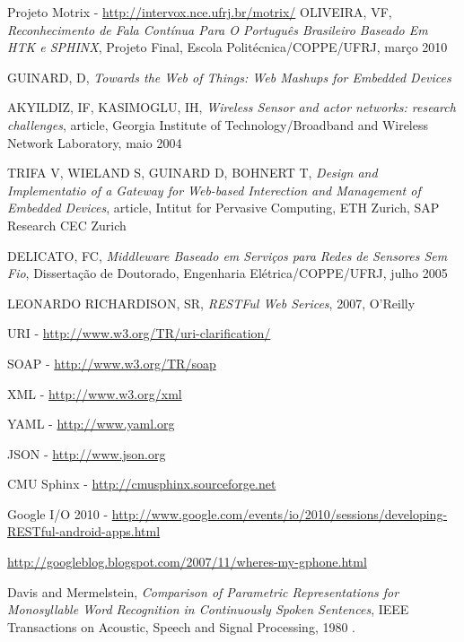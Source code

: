 \documentclass[12pt,a4paper,oneside]{report}
\begin{document}
\begin{thebibliography}{99}
	Projeto Motrix - \url{http://intervox.nce.ufrj.br/motrix/}
	OLIVEIRA, VF,
	\emph{Reconhecimento de Fala Contínua Para O Português Brasileiro Baseado Em HTK e SPHINX}, Projeto Final, Escola Politécnica/COPPE/UFRJ, março 2010

	GUINARD, D,
	\emph{Towards the Web of Things: Web Mashups for Embedded Devices}

	AKYILDIZ, IF, KASIMOGLU, IH,
	\emph{Wireless Sensor and actor networks: research challenges},
	article, Georgia Institute of Technology/Broadband and Wireless Network Laboratory, maio 2004

	TRIFA V, WIELAND S, GUINARD D, BOHNERT T,
	\emph{Design and Implementatio of a Gateway for Web-based Interection and Management of Embedded Devices},
	article, Intitut for Pervasive Computing, ETH Zurich, SAP Research CEC Zurich

	DELICATO, FC,
	\emph{Middleware Baseado em Serviços para Redes de Sensores Sem Fio},
	Dissertação de Doutorado,
	Engenharia Elétrica/COPPE/UFRJ, julho 2005

	LEONARDO RICHARDISON, SR,
	\emph{RESTFul Web Serices}, 2007, O'Reilly

	URI - \url{http://www.w3.org/TR/uri-clarification/}

	SOAP - \url{http://www.w3.org/TR/soap}

	XML - \url{http://www.w3.org/xml}

	YAML - \url{http://www.yaml.org}

	JSON - \url{http://www.json.org}

	CMU Sphinx - \url{http://cmusphinx.sourceforge.net}

	Google I/O 2010 - \url{http://www.google.com/events/io/2010/sessions/developing-RESTful-android-apps.html}

	\url{http://googleblog.blogspot.com/2007/11/wheres-my-gphone.html}

	Davis and Mermelstein, 
	\emph{Comparison of Parametric Representations for Monosyllable Word Recognition in Continuously Spoken Sentences},
	IEEE Transactions on Acoustic, Speech and Signal Processing, 1980 .


\end{thebibliography}
\end{document}
